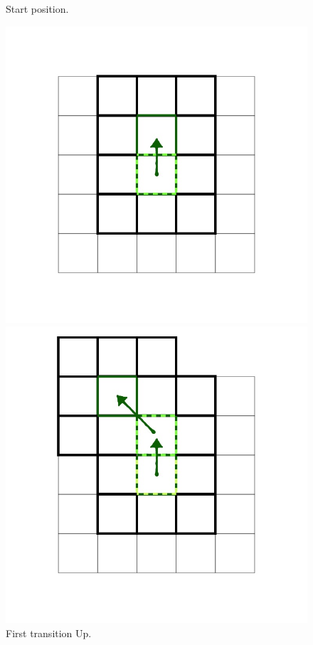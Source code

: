 \documentclass[class=article, crop=false]{standalone}
\begin{document}
\begin{figure}[ht]
\begin{minipage}[c]{0.33\linewidth}
\captionsetup{width=.8\linewidth}
\caption{Start position.}
\label{fig:Thesis_D2Q9andQ9.013}
\end{minipage}
\begin{minipage}[c]{0.33\linewidth}
\centering

\includegraphics[scale=0.17]{draw/Thesis_plots/Thesis_D2Q9andQ9_crop/Thesis_D2Q9andQ9.014}

\captionsetup{width=.8\linewidth}
\caption{First transition Up.}
\label{fig:Thesis_D2Q9andQ9.014}
\end{minipage}
\begin{minipage}[c]{0.33\linewidth}
\centering

\includegraphics[scale=0.17]{draw/Thesis_plots/Thesis_D2Q9andQ9_crop/Thesis_D2Q9andQ9.015}


\end{minipage}
\end{figure}
\end{document}
